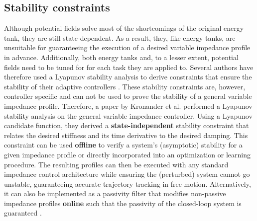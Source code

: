 \subsection{Stability constraints}

Although potential fields solve most of the shortcomings of the original energy tank, they are still state-dependent. As a result, they, like energy tanks, are unsuitable for guaranteeing the execution of a desired variable impedance profile in advance. Additionally, both energy tanks and, to a lesser extent, potential fields need to be tuned for for each task they are applied to. Several authors have therefore used a Lyapunov stability analysis to derive constraints that ensure the stability of their adaptive controllers \cite{leeForceTrackingImpedance2008,linUnifiedMotionForce2021,maFractionalorderSlidingMode2019,maVariableStiffnessDamping2019,sunModelReferenceAdaptive2021,yangHumanlikeAdaptationForce2011,wahballaConstantForceTracking2022,liForceImpedanceTrajectory2018,hamedaniIntelligentImpedanceControl2021,hamedaniRecurrentFuzzyWavelet2021,ganeshVersatileBiomimeticController2012}. These stability constraints are, however, controller specific and can not be used to prove the stability of a general variable impedance profile. Therefore, a paper by Kronander et al. \cite{kronanderStabilityConsiderationsVariable2016} performed a Lyapunov stability analysis on the general variable impedance controller. Using a Lyapunov candidate function, they derived a \textbf{state-independent} stability constraint that relates the desired stiffness and its time derivative to the desired damping. This constraint can be used \textbf{offline} to verify a system's (asymptotic) stability for a given impedance profile or directly incorporated into an optimization or learning procedure. The resulting profiles can then be executed with any standard impedance control architecture while ensuring the (perturbed) system cannot go unstable, guaranteeing accurate trajectory tracking in free motion. Alternatively, it can also be implemented as a passivity filter that modifies non-passive impedance profiles \textbf{online} such that the passivity of the closed-loop system is guaranteed \cite{bednarczykPassivityFilterVariable2020}.

